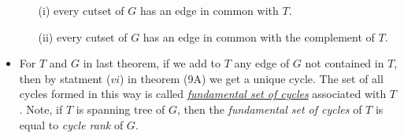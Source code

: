 \documentclass[12pt,a4paper, twocolumn]{article}
\begin{document}
\begin{itemize}
{			\begin{itemize}
				\item[(i)] every cutset of $G$ has an edge in common with $T$.
				\item[(ii)] every cutset of $G$ has an edge in common with the complement of $T$.
			\end{itemize}
		}
		\item For $T$ and $G$ in last theorem, if we add to $T$ any edge of $G$ not contained in $T$, then by statment ($vi$) in theorem (9A) we get a unique cycle. The set of all cycles formed in this way is called \underline{\emph{\color{magenta} fundamental set of cycles}} associated with $T$. Note, if $T$ is spanning tree of $G$, then the \emph{fundamental set of cycles} of $T$ is equal to \emph{cycle rank} of $G$.
\end{itemize}
\end{document}
